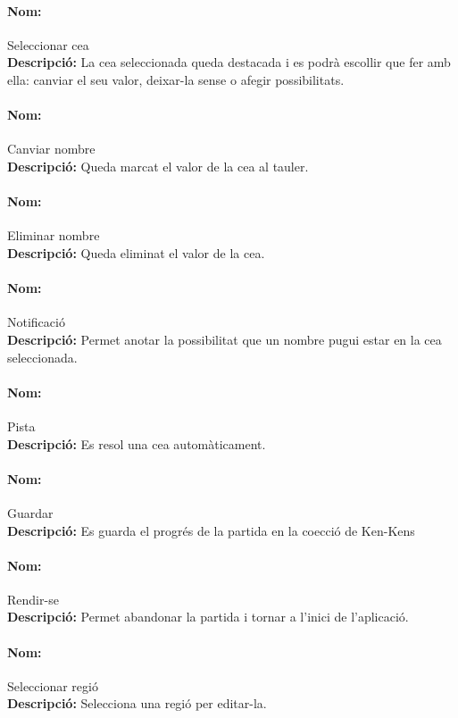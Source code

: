 \documentclass[a4paper,12pt]{article}
\begin{document}
\paragraph{Nom:} Seleccionar ce\lgem a\\
\textbf{Descripció:} 
La ce\lgem a seleccionada queda destacada i es podrà escollir que fer amb ella: canviar el seu valor, deixar-la sense o afegir possibilitats.


\paragraph{Nom:} Canviar nombre\\
\textbf{Descripció:} 
Queda marcat el valor de la ce\lgem a al tauler.


\paragraph{Nom:} Eliminar nombre\\
\textbf{Descripció:} 
Queda eliminat el valor de la ce\lgem a.

\paragraph{Nom:} Notificació\\ %
\textbf{Descripció:} 
Permet anotar la possibilitat que un nombre pugui estar en la ce\lgem a seleccionada.

\paragraph{Nom:} Pista\\
\textbf{Descripció:} 
Es resol una ce\lgem a automàticament.


\paragraph{Nom:} Guardar\\
\textbf{Descripció:} 
Es guarda el progrés de la partida en la co\lgem ecció de Ken-Kens


\paragraph{Nom:} Rendir-se\\
\textbf{Descripció:} 
Permet abandonar la partida i tornar a l'inici de l'aplicació.


\paragraph{Nom:} Seleccionar regió\\
\textbf{Descripció:}
Selecciona una regió per editar-la.
\end{document}
